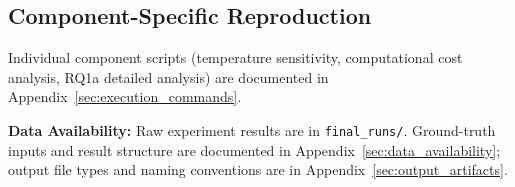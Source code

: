 \subsection{Component-Specific Reproduction}

Individual component scripts (temperature sensitivity, computational cost analysis, RQ1a detailed analysis) are documented in Appendix~\ref{sec:execution_commands}.

\textbf{Data Availability:} Raw experiment results are in \texttt{final\_runs/}. Ground-truth inputs and result structure are documented in Appendix~\ref{sec:data_availability}; output file types and naming conventions are in Appendix~\ref{sec:output_artifacts}.